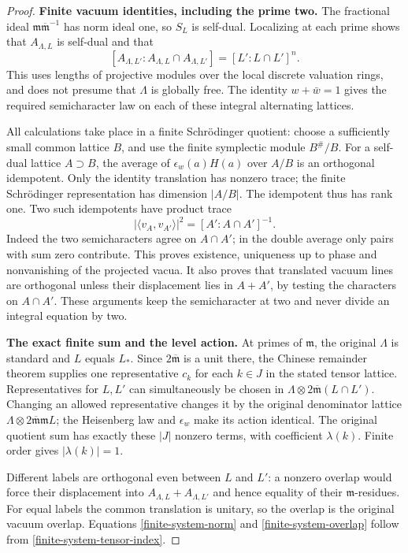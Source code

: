 \begin{proof}
\textbf{Finite vacuum identities, including the prime two.}
The fractional ideal $\mathfrak m\overline{\mathfrak m}^{-1}$
has norm ideal one, so $S_L$ is self-dual. Localizing at each
prime shows that $A_{\Lambda,L}$ is self-dual and that
\begin{equation}\label{finite-system-tensor-index}
 [A_{\Lambda,L'}:A_{\Lambda,L}\cap A_{\Lambda,L'}]
                           =[L':L\cap L']^n.
\end{equation}
This uses lengths of projective modules over the local discrete
valuation rings, and does not presume that $\Lambda$ is globally
free. The identity $w+\bar w=1$ gives the required semicharacter
law on each of these integral alternating lattices.

All calculations take place in a finite Schr\"odinger quotient:
choose a sufficiently small common lattice $B$, and use the finite
symplectic module $B^\#/B$. For a self-dual lattice $A\supset B$,
the average of $\epsilon_w(a)H(a)$ over $A/B$ is an orthogonal
idempotent. Only the identity translation has nonzero trace;
the finite Schr\"odinger representation has dimension
$|A/B|$. The idempotent thus has rank one. Two such idempotents
have product trace
\[
 |\langle v_A,v_{A'}\rangle|^2=[A':A\cap A']^{-1}.
\]
Indeed the two semicharacters agree on $A\cap A'$; in the double
average only pairs with sum zero contribute. This proves existence,
uniqueness up to phase and nonvanishing of the projected vacua.
It also proves that translated vacuum lines are orthogonal unless
their displacement lies in $A+A'$, by testing the characters on
$A\cap A'$. These arguments keep the semicharacter at two and
never divide an integral equation by two.

\textbf{The exact finite sum and the level action.}
At primes of $\mathfrak m$, the original $\Lambda$ is standard
and $L$ equals $L_*$. Since $2\overline{\mathfrak m}$ is a unit
there, the Chinese remainder theorem supplies one representative
$c_k$ for each $k\in J$ in the stated tensor lattice. Representatives
for $L,L'$ can simultaneously be chosen in
$\Lambda\otimes2\overline{\mathfrak m}(L\cap L')$.
Changing an allowed representative changes it by the original
denominator lattice
$\Lambda\otimes2\overline{\mathfrak m}\mathfrak m L$;
the Heisenberg law and $\epsilon_w$ make its action identical.
The original quotient sum has exactly these $|J|$ nonzero terms,
with coefficient $\lambda(k)$. Finite order gives $|\lambda(k)|=1$.

Different labels are orthogonal even between $L$ and $L'$:
a nonzero overlap would force their displacement into
$A_{\Lambda,L}+A_{\Lambda,L'}$ and hence equality of their
$\mathfrak m$-residues. For equal labels the common translation
is unitary, so the overlap is the original vacuum overlap. Equations
\eqref{finite-system-norm} and \eqref{finite-system-overlap}
follow from \eqref{finite-system-tensor-index}.


\end{proof}
